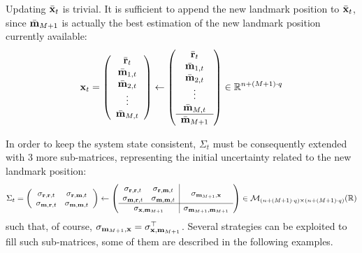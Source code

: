 	Updating $\bar{\boldsymbol{\mathrm{{x}}}}_{t}$ is trivial.
	It is sufficient to append the new landmark position to $\bar{\boldsymbol{\mathrm{{x}}}}_{t}$, since $\bar{\boldsymbol{\mathrm{{m}}}}_{M+1}$ is actually the best estimation of the new landmark position currently available:
	\begin{equation}
		\label{eq.extension.state.mean}
		\boldsymbol{\mathrm{{x}}}_t =
		\left(\begin{array}{c}
			\bar{\boldsymbol{\mathrm{{r}}}}_t \\ \bar{\boldsymbol{\mathrm{{m}}}}_{1,t} \\ \bar{\boldsymbol{\mathrm{{m}}}}_{2,t} \\ \vdots \\ \bar{\boldsymbol{\mathrm{{m}}}}_{M,t}
		\end{array}\right)
		\leftarrow
		\left(\begin{array}{c}
			\bar{\boldsymbol{\mathrm{{r}}}}_t \\ \bar{\boldsymbol{\mathrm{{m}}}}_{1,t} \\ \bar{\boldsymbol{\mathrm{{m}}}}_{2,t} \\ \vdots \\ \bar{\boldsymbol{\mathrm{{m}}}}_{M,t} \\ \hline \bar{\boldsymbol{\mathrm{{m}}}}_{M + 1}
		\end{array}\right)
		\in \mathbb{R}^{n + (M + 1) \cdot q}
	\end{equation}
	
	In order to keep the system state consistent, $\Sigma_{t}$ must be consequently extended with 3 more sub-matrices, representing the initial uncertainty related to the new landmark position:
	\begin{equation}
		\label{eq.extension.state.covs}
		\Sigma_t =
		\left(\begin{array}{cc}
			\sigma_{\vect{r}, \vect{r}, t} & \sigma_{\vect{r}, \vect{m}, t} \\
			\sigma_{\vect{m}, \vect{r}, t} & \sigma_{\vect{m}, \vect{m}, t}
		\end{array}\right)
		\leftarrow
		\left(\begin{array}{cc|c}
			\sigma_{\vect{r},\vect{r},t} & \sigma_{\vect{r},\vect{m},t} & \multicolumn{1}{c}{\multirow{2}{*}{$\sigma_{\vect{m}_{M+1},\vect{x}}$}}\\
			\sigma_{\vect{m},\vect{r},t} & \sigma_{\vect{m},\vect{m},t} & \\
			\hline
			\multicolumn{2}{c|}{\sigma_{\vect{x},\vect{m}_{M+1}}} & \sigma_{\vect{m}_{M+1},\vect{m}_{M+1}}
		\end{array}\right)
		\in \mathcal{M}_{(n + (M + 1) \cdot q) \times (n + (M + 1) \cdot q)}(\mathbb{R})
	\end{equation}
	such that, of course, $\sigma_{\boldsymbol{\mathrm{{m}}}_{M+1},\boldsymbol{\mathrm{{x}}}} = \sigma^\top_{\boldsymbol{\mathrm{{x}}},\boldsymbol{\mathrm{{m}}}_{M+1}}$.
	Several strategies can be exploited to fill such sub-matrices, some of them are described in the following examples.
	
